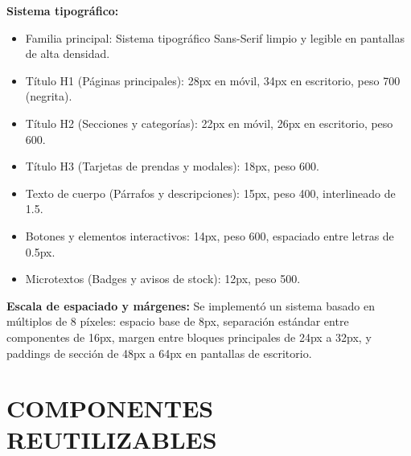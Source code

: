 \documentclass[12pt]{article}
\begin{document}
\textbf{Sistema tipográfico:}
\begin{itemize}
    \item Familia principal: Sistema tipográfico Sans-Serif limpio y legible en pantallas de alta densidad.
    \item Título H1 (Páginas principales): 28px en móvil, 34px en escritorio, peso 700 (negrita).
    \item Título H2 (Secciones y categorías): 22px en móvil, 26px en escritorio, peso 600.
    \item Título H3 (Tarjetas de prendas y modales): 18px, peso 600.
    \item Texto de cuerpo (Párrafos y descripciones): 15px, peso 400, interlineado de 1.5.
    \item Botones y elementos interactivos: 14px, peso 600, espaciado entre letras de 0.5px.
    \item Microtextos (Badges y avisos de stock): 12px, peso 500.
\end{itemize}

\textbf{Escala de espaciado y márgenes:}
Se implementó un sistema basado en múltiplos de 8 píxeles: espacio base de 8px, separación estándar entre componentes de 16px, margen entre bloques principales de 24px a 32px, y paddings de sección de 48px a 64px en pantallas de escritorio.

\section*{COMPONENTES REUTILIZABLES}
\end{document}

